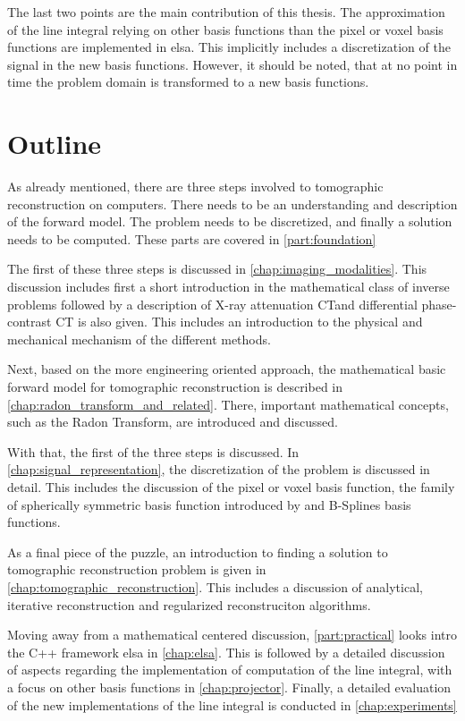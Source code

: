 The last two points are the main contribution of this thesis. The approximation of the line integral
relying on other basis functions than the pixel or voxel basis functions are implemented in elsa.
This implicitly includes a discretization of the signal in the new basis functions. However, it
should be noted, that at no point in time the problem domain is transformed to a new basis
functions.

\section{Outline}\label{sec:outline}

As already mentioned, there are three steps involved to tomographic reconstruction on computers.
There needs to be an understanding and description of the forward model. The problem needs to be
discretized, and finally a solution needs to be computed. These parts are covered in
\autoref{part:foundation}

The first of these three steps is discussed in \autoref{chap:imaging_modalities}. This discussion
includes first a short introduction in the mathematical class of inverse problems followed by a
description of X-ray attenuation CT\@ and differential phase-contrast CT is also given. This
includes an introduction to the physical and mechanical mechanism of the different methods.

Next, based on the more engineering oriented approach, the mathematical basic forward model for
tomographic reconstruction is described in \autoref{chap:radon_transform_and_related}. There,
important mathematical concepts, such as the Radon Transform, are introduced and discussed.

With that, the first of the three steps is discussed. In \autoref{chap:signal_representation}, the
discretization of the problem is discussed in detail. This includes the discussion of the pixel or
voxel basis function, the family of spherically symmetric basis function introduced by
\citeauthor*{lewitt_multidimensional_1990} and B-Splines basis functions.

As a final piece of the puzzle, an introduction to finding a solution to tomographic reconstruction
problem is given in \autoref{chap:tomographic_reconstruction}. This includes a discussion of
analytical, iterative reconstruction and regularized reconstruciton algorithms.

Moving away from a mathematical centered discussion, \autoref{part:practical} looks intro the C++
framework elsa in \autoref{chap:elsa}. This is followed by a detailed discussion of aspects
regarding the implementation of computation of the line integral, with a focus on other basis
functions in \autoref{chap:projector}. Finally, a detailed evaluation of the new implementations of
the line integral is conducted in \autoref{chap:experiments}

